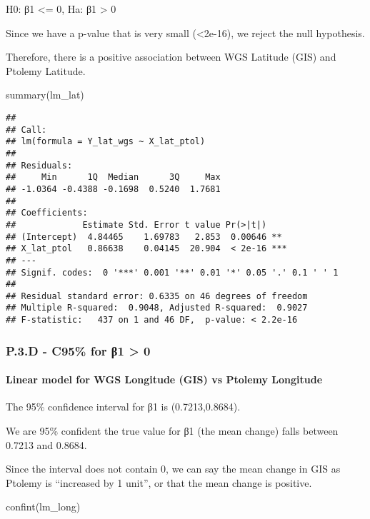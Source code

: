 \documentclass[
]{article}
\newenvironment{Shaded}{\begin{snugshade}}{\end{snugshade}}
\newcommand{\FunctionTok}[1]{\textcolor[rgb]{0.00,0.00,0.00}{#1}}
\newcommand{\NormalTok}[1]{#1}
\begin{document}
H0: β1 \textless= 0, Ha: β1 \textgreater{} 0

Since we have a p-value that is very small (\textless2e-16), we reject
the null hypothesis.

Therefore, there is a positive association between WGS Latitude (GIS)
and Ptolemy Latitude.

\begin{Shaded}
\begin{Highlighting}[]
\FunctionTok{summary}\NormalTok{(lm\_lat)}
\end{Highlighting}
\end{Shaded}

\begin{verbatim}
## 
## Call:
## lm(formula = Y_lat_wgs ~ X_lat_ptol)
## 
## Residuals:
##     Min      1Q  Median      3Q     Max 
## -1.0364 -0.4388 -0.1698  0.5240  1.7681 
## 
## Coefficients:
##             Estimate Std. Error t value Pr(>|t|)    
## (Intercept)  4.84465    1.69783   2.853  0.00646 ** 
## X_lat_ptol   0.86638    0.04145  20.904  < 2e-16 ***
## ---
## Signif. codes:  0 '***' 0.001 '**' 0.01 '*' 0.05 '.' 0.1 ' ' 1
## 
## Residual standard error: 0.6335 on 46 degrees of freedom
## Multiple R-squared:  0.9048, Adjusted R-squared:  0.9027 
## F-statistic:   437 on 1 and 46 DF,  p-value: < 2.2e-16
\end{verbatim}

\hypertarget{p.3.d---c95-for-ux3b21-0}{%
\subsubsection{P.3.D - C95\% for β1 \textgreater{}
0}\label{p.3.d---c95-for-ux3b21-0}}

\hypertarget{linear-model-for-wgs-longitude-gis-vs-ptolemy-longitude}{%
\paragraph{Linear model for WGS Longitude (GIS) vs Ptolemy
Longitude}\label{linear-model-for-wgs-longitude-gis-vs-ptolemy-longitude}}

The 95\% confidence interval for β1 is (0.7213,0.8684).

We are 95\% confident the true value for β1 (the mean change) falls
between 0.7213 and 0.8684.

Since the interval does not contain 0, we can say the mean change in GIS
as Ptolemy is ``increased by 1 unit'', or that the mean change is
positive.

\begin{Shaded}
\begin{Highlighting}[]
\FunctionTok{confint}\NormalTok{(lm\_long)}
\end{Highlighting}
\end{Shaded}
\end{document}
